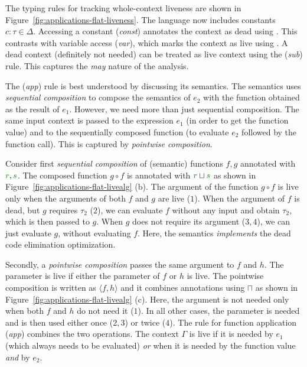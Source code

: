 The typing rules for tracking whole-context liveness are shown in Figure~\ref{fig:applications-flat-liveness}.
The language now includes constants $c:\tau \in \Delta$. Accessing a constant (\emph{const}) annotates
the context as dead using . This contrasts with variable access (\emph{var}), which marks the
context as live using . A dead context (definitely not needed) can be treated as live context
using the (\emph{sub}) rule. This captures the \emph{may} nature of the analysis.

The (\emph{app}) rule is best understood by discussing its semantics. The semantics uses 
\emph{sequential composition} to compose the semantics of $e_2$ with the function obtained
as the result of $e_1$. However, we need more than just sequential composition. The same input
context is passed to the expression $e_1$ (in order to get the function value) and to the
sequentially composed function (to evaluate $e_2$ followed by the function call). This is captured 
by \emph{pointwise composition}.

Consider first \emph{sequential composition} of (semantic) functions $f, g$ annotated with 
$\cclrd{r}, \cclrd{s}$. The composed function $g \circ f$ is annotated with $\cclrd{r} \sqcup \cclrd{s}$
as shown in Figure~\ref{fig:applications-flat-livealg} (b).
The argument of the function $g \circ f$ is live only when the arguments of both $f$ and $g$ are 
live ($1$). When the argument of $f$ is dead, but $g$ requires $\tau_2$ ($2$), we can evaluate 
$f$ without any input and obtain $\tau_2$, which is then passed to $g$. When $g$ does not require
its argument ($3, 4$), we can just evaluate $g$, without evaluating $f$. Here, the semantics
\emph{implements} the dead code elimination optimization.

Secondly, a \emph{pointwise composition} passes the same argument to $f$ and $h$. The parameter 
is live if either the parameter of $f$ or $h$ is live. The pointwise composition is written as
$\langle f, h \rangle$ and it combines annotations using $\sqcap$ as shown in Figure~\ref{fig:applications-flat-livealg} (c).
Here, the argument is not needed only when both $f$ and $h$ do not need it ($1$). In all other cases,
the parameter is needed and is then used either once ($2,3$) or twice ($4$). The rule for function
application (\emph{app}) combines the two operations. The context $\Gamma$ is live if it is needed by
$e_1$ (which always needs to be evaluated) \emph{or} when it is needed by the function value \emph{and}
by $e_2$. 

